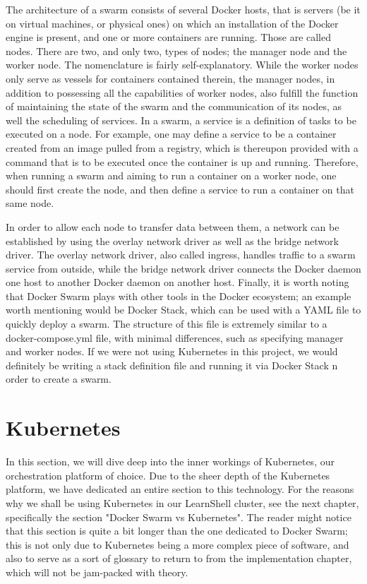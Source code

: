 \documentclass[thesis=B,english]{FITthesis}[2019/12/23]
\begin{document}
The architecture of a swarm consists of several Docker hosts, that is servers (be it on virtual machines, or physical ones) on which an installation of the Docker engine is present, and one or more containers are running. \cite{swarm-key-concepts} Those are called nodes. There are two, and only two, types of nodes; the manager node and the worker node. The nomenclature is fairly self-explanatory. While the worker nodes only serve as vessels for containers contained therein, the manager nodes, in addition to possessing all the capabilities of worker nodes, also fulfill the function of maintaining the state of the swarm and the communication of its nodes, as well the scheduling of services. In a swarm, a service is a definition of tasks to be executed on a node. \cite{swarm-nodes} For example, one may define a service to be a container created from an image pulled from a registry, which is thereupon provided with a command that is to be executed once the container is up and running. Therefore, when running a swarm and aiming to run a container on a worker node, one should first create the node, and then define a service to run a container on that same node.

In order to allow each node to transfer data between them, a network can be established by using the overlay network driver as well as the bridge network driver. The overlay network driver, also called ingress, handles traffic to a swarm service from outside, while the bridge network driver connects the Docker daemon one host to another Docker daemon on another host. 
Finally, it is worth noting that Docker Swarm plays with other tools in the Docker ecosystem; an example worth mentioning would be Docker Stack, which can be used with a YAML file to quickly deploy a swarm. The structure of this file is extremely similar to a docker-compose.yml file, with minimal differences, such as specifying manager and worker nodes. If we were not using Kubernetes in this project, we would definitely be writing a stack definition file and running it via Docker Stack n order to create a swarm. 

\clearpage

\section{Kubernetes}

In this section, we will dive deep into the inner workings of Kubernetes, our orchestration platform of choice. Due to the sheer depth of the Kubernetes platform, we have dedicated an entire section to this technology. For the reasons why we shall be using Kubernetes in our LearnShell cluster, see the next chapter, specifically the section "Docker Swarm vs Kubernetes". The reader might notice that this section is quite a bit longer than the one dedicated to Docker Swarm; this is not only due to Kubernetes being a more complex piece of software, and also to serve as a sort of glossary to return to from the implementation chapter, which will not be jam-packed with theory.
\end{document}
